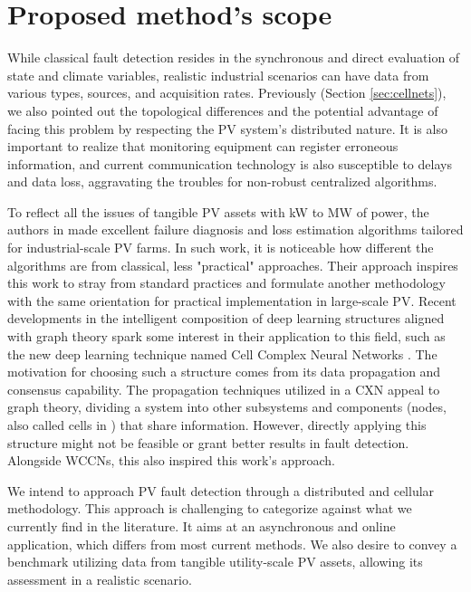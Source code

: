 \section{Proposed method's scope}


While classical fault detection resides in the synchronous and direct evaluation of state and climate variables, realistic industrial scenarios can have data from various types, sources, and acquisition rates. Previously (Section \ref{sec:cellnets}), we also pointed out the topological differences and the potential advantage of facing this problem by respecting the PV system's distributed nature.
It is also important to realize that monitoring equipment can register erroneous information, and current communication technology is also susceptible to delays and data loss, aggravating the troubles for non-robust centralized algorithms.

To reflect all the issues of tangible PV assets with kW to MW of power, the authors in \cite{Livera2022} made excellent failure diagnosis and loss estimation algorithms tailored for industrial-scale PV farms. In such work, it is noticeable how different the algorithms are from classical, less "practical" approaches. Their approach inspires this work to stray from standard practices and formulate another methodology with the same orientation for practical implementation in large-scale PV.
Recent developments in the intelligent composition of deep learning structures aligned with graph theory spark some interest in their application to this field, such as the new deep learning technique named Cell Complex Neural Networks \cite{Hajij2020}. The motivation for choosing such a structure comes from its data propagation and consensus capability. The propagation techniques utilized in a CXN appeal to graph theory, dividing a system into other subsystems and components (nodes, also called cells in \cite{Hajij2020}) that share information. However, directly applying this structure might not be feasible or grant better results in fault detection. Alongside WCCNs, this also inspired this work's approach.

We intend to approach PV fault detection through a distributed and cellular methodology. This approach is challenging to categorize against what we currently find in the literature. It aims at an asynchronous and online application, which differs from most current methods. We also desire to convey a benchmark utilizing data from tangible utility-scale PV assets, allowing its assessment in a realistic scenario.
